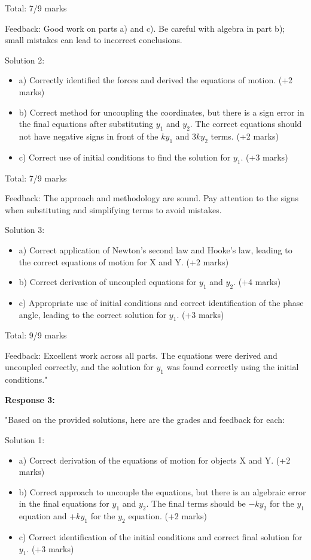 \documentclass[a4paper,11pt]{article}
\begin{document}
Total: 7/9 marks

Feedback: Good work on parts a) and c). Be careful with algebra in part b); small mistakes can lead to incorrect conclusions.

Solution 2:

\begin{itemize}
    \item a) Correctly identified the forces and derived the equations of motion. (+2 marks)
    \item b) Correct method for uncoupling the coordinates, but there is a sign error in the final equations after substituting \( y_1 \) and \( y_2 \). The correct equations should not have negative signs in front of the \( ky_1 \) and \( 3ky_2 \) terms. (+2 marks)
    \item c) Correct use of initial conditions to find the solution for \( y_1 \). (+3 marks)
\end{itemize}

Total: 7/9 marks

Feedback: The approach and methodology are sound. Pay attention to the signs when substituting and simplifying terms to avoid mistakes.

Solution 3:

\begin{itemize}
    \item a) Correct application of Newton's second law and Hooke's law, leading to the correct equations of motion for X and Y. (+2 marks)
    \item b) Correct derivation of uncoupled equations for \( y_1 \) and \( y_2 \). (+4 marks)
    \item c) Appropriate use of initial conditions and correct identification of the phase angle, leading to the correct solution for \( y_1 \). (+3 marks)
\end{itemize}

Total: 9/9 marks

Feedback: Excellent work across all parts. The equations were derived and uncoupled correctly, and the solution for \( y_1 \) was found correctly using the initial conditions."

\textbf{Response 3:}

"Based on the provided solutions, here are the grades and feedback for each:

Solution 1:

\begin{itemize}
    \item a) Correct derivation of the equations of motion for objects X and Y. (+2 marks)
    \item b) Correct approach to uncouple the equations, but there is an algebraic error in the final equations for \( y_1 \) and \( y_2 \). The final terms should be \( -ky_2 \) for the \( y_1 \) equation and \( +ky_1 \) for the \( y_2 \) equation. (+2 marks)
    \item c) Correct identification of the initial conditions and correct final solution for \( y_1 \). (+3 marks)
\end{itemize}
\end{document}
